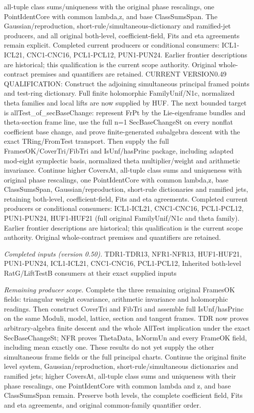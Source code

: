 \documentclass[11pt,a4paper]{article}
\numberwithin{equation}{section}
\theoremstyle{remark}\newtheorem{remark}[theorem]{Remark}
\begin{document}
all-tuple class sums/uniqueness with the original phase rescalings, one PointIdentCore with common lambda,z, and base ClassSumsSpan. The Gaussian/reproduction, short-rule/simultaneous-dictionary and ramified-jet producers, and all original both-level, coefficient-field, Fits and eta agreements remain explicit. Completed current producers or conditional consumers: ICL1-ICL21, CNC1-CNC16, PCL1-PCL12, PUN1-PUN24. Earlier frontier descriptions are historical; this qualification is the current scope authority. Original whole-contract premises and quantifiers are retained. CURRENT VERSION0.49 QUALIFICATION: Construct the adjoining simultaneous principal framed points and test-ring dictionary. Full finite holomorphic FamilyUnif/N1c, normalized theta families and local lifts are now supplied by HUF. The next bounded target is allTest\_\allowbreak of\_\allowbreak secBaseChange: represent FrPt by the Lie-eigenframe bundles and theta-section frame line, use the full n=1 SecBaseChangeSt on every nonflat coefficient base change, and prove finite-generated subalgebra descent with the exact TRing/FromTest transport. Then supply the full FramesOK/CoverTri/FibTri and IsUnf/hasPrinc package, including adapted mod-eight symplectic basis, normalized theta multiplier/weight and arithmetic invariance. Continue higher CoversAt, all-tuple class sums and uniqueness with original phase rescalings, one PointIdentCore with common lambda,z, base ClassSumsSpan, Gaussian/reproduction, short-rule dictionaries and ramified jets, retaining both-level, coefficient-field, Fits and eta agreements. Completed current producers or conditional consumers: ICL1-ICL21, CNC1-CNC16, PCL1-PCL12, PUN1-PUN24, HUF1-HUF21 (full original FamilyUnif/N1c and theta family). Earlier frontier descriptions are historical; this qualification is the current scope authority. Original whole-contract premises and quantifiers are retained.

\emph{Completed inputs (version 0.50).} TDR1-TDR13, NFR1-NFR13, HUF1-HUF21, PUN1-PUN24, ICL1-ICL21, CNC1-CNC16, PCL1-PCL12, Inherited both-level RatG/LiftTestB consumers at their exact supplied inputs

\emph{Remaining producer scope.} Complete the three remaining original FramesOK fields: triangular weight covariance, arithmetic invariance and holomorphic readings. Then construct CoverTri and FibTri and assemble full IsUnf/hasPrinc on the same Moduli, model, lattice, section and tangent frames. TDR now proves arbitrary-algebra finite descent and the whole AllTest implication under the exact SecBaseChangeSt; NFR proves ThetaData, IsNormUn and every FrameOK field, including mean exactly one. These results do not yet supply the other simultaneous frame fields or the full principal charts. Continue the original finite level system, Gaussian/reproduction, short-rule/simultaneous dictionaries and ramified jets; higher CoversAt, all-tuple class sums and uniqueness with their phase rescalings, one PointIdentCore with common lambda and z, and base ClassSumsSpan remain. Preserve both levels, the complete coefficient field, Fits and eta agreements, and original common-family quantifier order.
\end{document}
